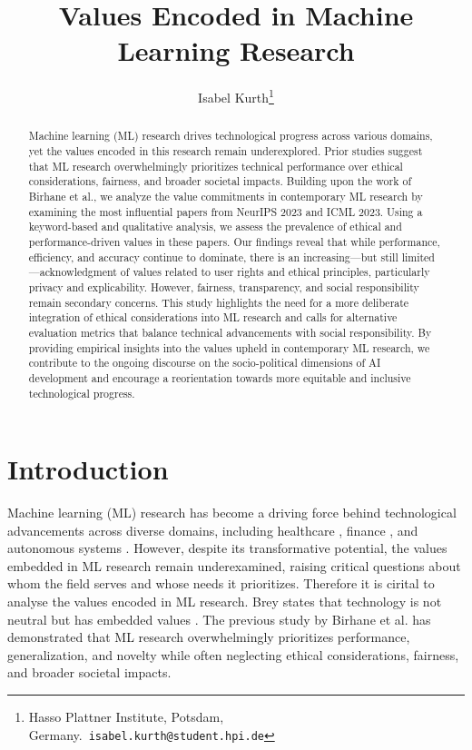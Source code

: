 \documentclass{article}
\title{Values Encoded in Machine Learning Research}
\author{Isabel Kurth\thanks{Hasso Plattner Institute, Potsdam, Germany.\ \texttt{isabel.kurth@student.hpi.de}}}
\begin{document}
\maketitle
\thispagestyle{plain}

\begin{abstract}
Machine learning (ML) research drives technological progress across various domains, yet the values encoded in this research remain underexplored. Prior studies suggest that ML research overwhelmingly prioritizes 
technical performance over ethical considerations, fairness, and broader societal impacts. Building upon the work of Birhane et al.\cite{valuesInML2021}, we analyze the value commitments in contemporary ML research by examining 
the most influential papers from NeurIPS 2023 and ICML 2023. Using a keyword-based and qualitative analysis, we assess the prevalence of ethical and performance-driven values in these papers. Our findings reveal that while 
performance, efficiency, and accuracy continue to dominate, there is an increasing—but still limited—acknowledgment of values related to user rights and ethical principles, particularly privacy and explicability. However, 
fairness, transparency, and social responsibility remain secondary concerns. This study highlights the need for a more deliberate integration of ethical considerations into ML research and calls for alternative evaluation metrics 
that balance technical advancements with social responsibility. By providing empirical insights into the values upheld in contemporary ML research, we contribute to the ongoing discourse on the socio-political dimensions of 
AI development and encourage a reorientation towards more equitable and inclusive technological progress.
\end{abstract}

\section{Introduction}
Machine learning (ML) research has become a driving force behind technological advancements across diverse domains, including healthcare \cite{esteva2019guide}, finance \cite{berg2022fintech}, and autonomous systems \cite{hawkins2021guidance}. 
However, despite its transformative potential, the values embedded in ML research remain underexamined, 
raising critical questions about whom the field serves and whose needs it prioritizes. Therefore it is cirital to analyse the values encoded in ML research. Brey states that technology is not neutral but has embedded values \cite{brey2010values}. 
The previous study by Birhane et al. \cite{valuesInML2021} has demonstrated that ML research overwhelmingly prioritizes 
performance, generalization, and novelty while often neglecting ethical considerations, fairness, and broader societal impacts.
\end{document}
